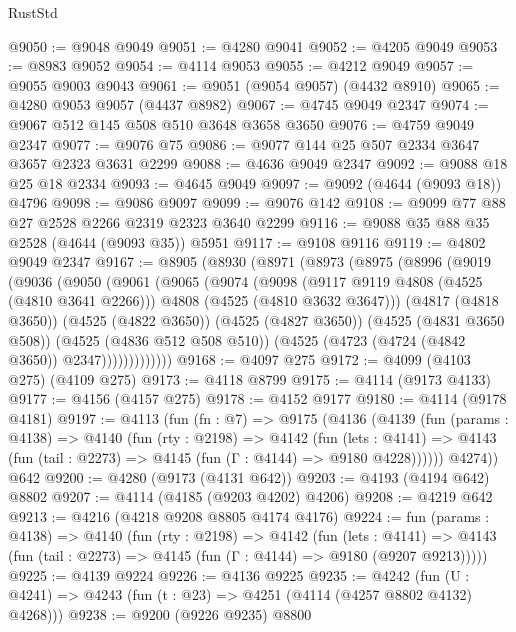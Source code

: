 \begin{lexlean}{RustStd}
\begin{coremodule}
{\begin{coremodule}
{{{{{{{{{{{{{{@9050 := @9048 @9049
@9051 := @4280 @9041
@9052 := @4205 @9049
@9053 := @8983 @9052
@9054 := @4114 @9053
@9055 := @4212 @9049
@9057 := @9055 @9003 @9043
@9061 := @9051 (@9054 @9057) (@4432 @8910)
@9065 := @4280 @9053 @9057 (@4437 @8982)
@9067 := @4745 @9049 @2347
@9074 := @9067 @512 @145 @508 @510 @3648 @3658 @3650
@9076 := @4759 @9049 @2347
@9077 := @9076 @75
@9086 := @9077 @144 @25 @507 @2334 @3647 @3657 @2323 @3631 @2299
@9088 := @4636 @9049 @2347
@9092 := @9088 @18 @25 @18 @2334
@9093 := @4645 @9049
@9097 := @9092 (@4644 (@9093 @18)) @4796
@9098 := @9086 @9097
@9099 := @9076 @142
@9108 := @9099 @77 @88 @27 @2528 @2266 @2319 @2323 @3640 @2299
@9116 := @9088 @35 @88 @35 @2528 (@4644 (@9093 @35)) @5951
@9117 := @9108 @9116
@9119 := @4802 @9049 @2347
@9167 := @8905
    (@8930
      (@8971
        (@8973
          (@8975
            (@8996
              (@9019
                (@9036
                  (@9050
                    (@9061
                      (@9065
                        (@9074
                          (@9098
                            (@9117 @9119 @4808 (@4525 (@4810 @3641 @2266)))
                            @4808
                            (@4525 (@4810 @3632 @3647)))
                          (@4817 (@4818 @3650))
                          (@4525 (@4822 @3650))
                          (@4525 (@4827 @3650))
                          (@4525 (@4831 @3650 @508))
                          (@4525 (@4836 @512 @508 @510))
                          (@4525 (@4723 (@4724 (@4842 @3650)) @2347)))))))))))))
@9168 := @4097 @275
@9172 := @4099 (@4103 @275) (@4109 @275)
@9173 := @4118 @8799
@9175 := @4114 (@9173 @4133)
@9177 := @4156 (@4157 @275)
@9178 := @4152 @9177
@9180 := @4114 (@9178 @4181)
@9197 := @4113
    (fun (fn : @7) =>
    @9175
      (@4136
        (@4139
          (fun (params : @4138) =>
          @4140
            (fun (rty : @2198) =>
            @4142
              (fun (lets : @4141) =>
              @4143 (fun (tail : @2273) => @4145 (fun (Γ : @4144) => @9180 @4228))))))
        @4274))
    @642
@9200 := @4280 (@9173 (@4131 @642))
@9203 := @4193 (@4194 @642) @8802
@9207 := @4114 (@4185 (@9203 @4202) @4206)
@9208 := @4219 @642
@9213 := @4216 (@4218 @9208 @8805 @4174 @4176)
@9224 := fun (params : @4138) =>
  @4140
    (fun (rty : @2198) =>
    @4142
      (fun (lets : @4141) =>
      @4143 (fun (tail : @2273) => @4145 (fun (Γ : @4144) => @9180 (@9207 @9213)))))
@9225 := @4139 @9224
@9226 := @4136 @9225
@9235 := @4242 (fun (U : @4241) => @4243 (fun (t : @23) => @4251 (@4114 (@4257 @8802 @4132) @4268)))
@9238 := @9200 (@9226 @9235) @8800
}}}}}}}}}}}}}}
\end{coremodule}}
\end{coremodule}
\end{lexlean}
